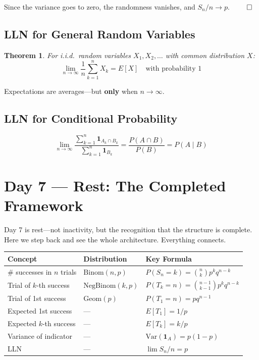 \documentclass[11pt]{article}
\newtheorem{theorem}{Theorem}
\begin{document}
Since the variance goes to zero, the randomness vanishes, and $S_n/n \to p$. $\qed$

\subsection{LLN for General Random Variables}

\begin{theorem}
For i.i.d.\ random variables $X_1, X_2, \ldots$ with common distribution $X$:
\[
\boxed{\lim_{n \to \infty} \frac{1}{n} \sum_{k=1}^{n} X_k = E[X] \quad \text{with probability 1}}
\]
\end{theorem}

Expectations are averages---but \textbf{only} when $n \to \infty$.

\subsection{LLN for Conditional Probability}

\[
\lim_{n \to \infty} \frac{\sum_{k=1}^{n} \mathbf{1}_{A_k \cap B_k}}{\sum_{k=1}^{n} \mathbf{1}_{B_k}} = \frac{P(A \cap B)}{P(B)} = P(A \mid B)
\]

\section{Day 7 --- Rest: The Completed Framework}

\begin{creationbox}
Day 7 is rest---not inactivity, but the recognition that the structure is complete. Here we step back and see the whole architecture. Everything connects.
\end{creationbox}

\renewcommand{\arraystretch}{1.4}
\begin{center}
\begin{tabular}{@{}lll@{}}
\toprule
\textbf{Concept} & \textbf{Distribution} & \textbf{Key Formula} \\
\midrule
\# successes in $n$ trials & $\text{Binom}(n,p)$ & $P(S_n = k) = \binom{n}{k}p^k q^{n-k}$ \\[3pt]
Trial of $k$-th success & $\text{NegBinom}(k,p)$ & $P(T_k = n) = \binom{n-1}{k-1}p^k q^{n-k}$ \\[3pt]
Trial of 1st success & $\text{Geom}(p)$ & $P(T_1 = n) = pq^{n-1}$ \\[3pt]
Expected 1st success & --- & $E[T_1] = 1/p$ \\[3pt]
Expected $k$-th success & --- & $E[T_k] = k/p$ \\[3pt]
Variance of indicator & --- & $\text{Var}(\mathbf{1}_A) = p(1-p)$ \\[3pt]
LLN & --- & $\lim S_n/n = p$ \\
\bottomrule
\end{tabular}
\end{center}
\end{document}

